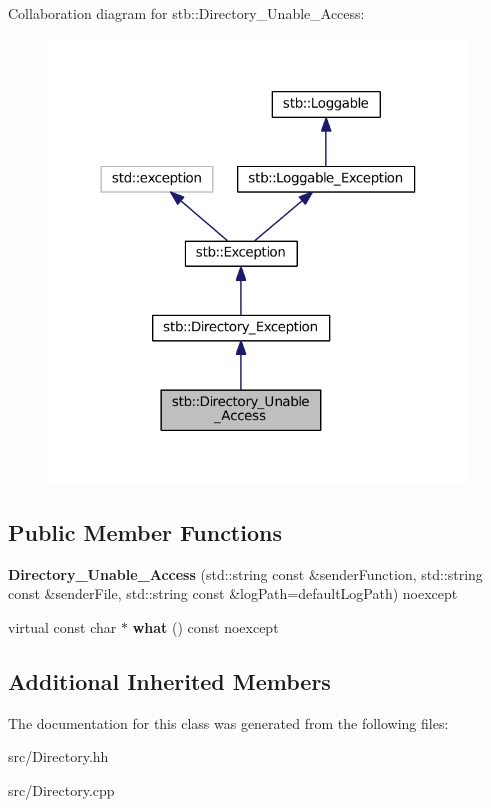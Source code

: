 Collaboration diagram for stb\+:\+:Directory\+\_\+\+Unable\+\_\+\+Access\+:
\nopagebreak
\begin{figure}[H]
\begin{center}
\leavevmode
\includegraphics[width=316pt]{classstb_1_1Directory__Unable__Access__coll__graph}
\end{center}
\end{figure}
\subsection*{Public Member Functions}
\begin{DoxyCompactItemize}
\item 
\hypertarget{classstb_1_1Directory__Unable__Access_a5476996cd1378a186990e17ea0482dad}{{\bfseries Directory\+\_\+\+Unable\+\_\+\+Access} (std\+::string const \&sender\+Function, std\+::string const \&sender\+File, std\+::string const \&log\+Path=default\+Log\+Path) noexcept}\label{classstb_1_1Directory__Unable__Access_a5476996cd1378a186990e17ea0482dad}

\item 
\hypertarget{classstb_1_1Directory__Unable__Access_a97c40cd42fea0fb5bcf0577eff17e270}{virtual const char $\ast$ {\bfseries what} () const noexcept}\label{classstb_1_1Directory__Unable__Access_a97c40cd42fea0fb5bcf0577eff17e270}

\end{DoxyCompactItemize}
\subsection*{Additional Inherited Members}


The documentation for this class was generated from the following files\+:\begin{DoxyCompactItemize}
\item 
src/Directory.\+hh\item 
src/Directory.\+cpp\end{DoxyCompactItemize}
